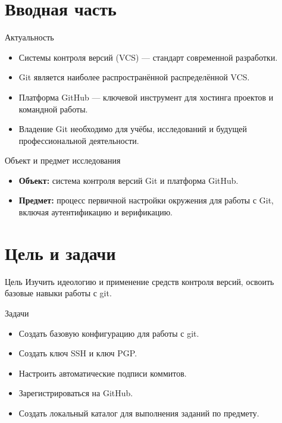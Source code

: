 \documentclass[
  ignorenonframetext,
  aspectratio=169,
  russian,
  aspectratio=169]{beamer}
\providecommand{\tightlist}{%
  \setlength{\itemsep}{0pt}\setlength{\parskip}{0pt}}
\begin{document}
\section{Вводная
часть}\label{ux432ux432ux43eux434ux43dux430ux44f-ux447ux430ux441ux442ux44c}

\begin{frame}{Актуальность}
\label{ux430ux43aux442ux443ux430ux43bux44cux43dux43eux441ux442ux44c}
\begin{itemize}[<+->]
\tightlist
\item
  Системы контроля версий (VCS) --- стандарт современной разработки.
\item
  Git является наиболее распространённой распределённой VCS.
\item
  Платформа GitHub --- ключевой инструмент для хостинга проектов и
  командной работы.
\item
  Владение Git необходимо для учёбы, исследований и будущей
  профессиональной деятельности.
\end{itemize}
\end{frame}

\begin{frame}{Объект и предмет исследования}
\label{ux43eux431ux44aux435ux43aux442-ux438-ux43fux440ux435ux434ux43cux435ux442-ux438ux441ux441ux43bux435ux434ux43eux432ux430ux43dux438ux44f}
\begin{itemize}[<+->]
\tightlist
\item
  \textbf{Объект:} система контроля версий Git и платформа GitHub.
\item
  \textbf{Предмет:} процесс первичной настройки окружения для работы с
  Git, включая аутентификацию и верификацию.
\end{itemize}
\end{frame}

\section{Цель и
задачи}\label{ux446ux435ux43bux44c-ux438-ux437ux430ux434ux430ux447ux438}

\begin{frame}{Цель}
\label{ux446ux435ux43bux44c}
Изучить идеологию и применение средств контроля версий, освоить базовые
навыки работы с git.
\end{frame}

\begin{frame}{Задачи}
\label{ux437ux430ux434ux430ux447ux438}
\begin{itemize}[<+->]
\tightlist
\item
  Создать базовую конфигурацию для работы с git.
\item
  Создать ключ SSH и ключ PGP.
\item
  Настроить автоматические подписи коммитов.
\item
  Зарегистрироваться на GitHub.
\item
  Создать локальный каталог для выполнения заданий по предмету.
\end{itemize}
\end{frame}
\end{document}
